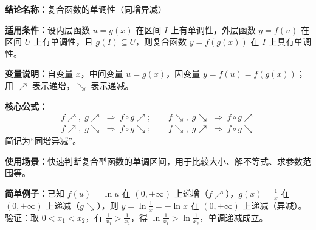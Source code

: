 \textbf{结论名称：}复合函数的单调性（同增异减）

\textbf{适用条件：}设内层函数 \(u=g(x)\) 在区间 \(I\) 上有单调性，外层函数 \(y=f(u)\) 在区间 \(U\) 上有单调性，且 \(g(I)\subseteq U\)，则复合函数 \(y=f(g(x))\) 在 \(I\) 上具有单调性。

\textbf{变量说明：}自变量 \(x\)，中间变量 \(u=g(x)\)，因变量 \(y=f(u)=f(g(x))\)；用 \(\nearrow\) 表示递增，\(\searrow\) 表示递减。

\textbf{核心公式：}
\[
\boxed{
\begin{array}{l}
f\nearrow,\;g\nearrow\;\Rightarrow\;f\circ g\nearrow;\qquad
f\searrow,\;g\searrow\;\Rightarrow\;f\circ g\nearrow\\[4pt]
f\nearrow,\;g\searrow\;\Rightarrow\;f\circ g\searrow;\qquad
f\searrow,\;g\nearrow\;\Rightarrow\;f\circ g\searrow
\end{array}
}
\]
简记为“同增异减”。

\textbf{使用场景：}快速判断复合型函数的单调区间，用于比较大小、解不等式、求参数范围等。

\textbf{简单例子：}已知 \(f(u)=\ln u\) 在 \((0,+\infty)\) 上递增（\(f\nearrow\)），\(g(x)=\frac{1}{x}\) 在 \((0,+\infty)\) 上递减（\(g\searrow\)），则 \(y=\ln\frac{1}{x}=-\ln x\) 在 \((0,+\infty)\) 上递减（异减）。验证：取 \(0<x_1<x_2\)，有 \(\frac{1}{x_1}>\frac{1}{x_2}\)，得 \(\ln\frac{1}{x_1}>\ln\frac{1}{x_2}\)，单调递减成立。